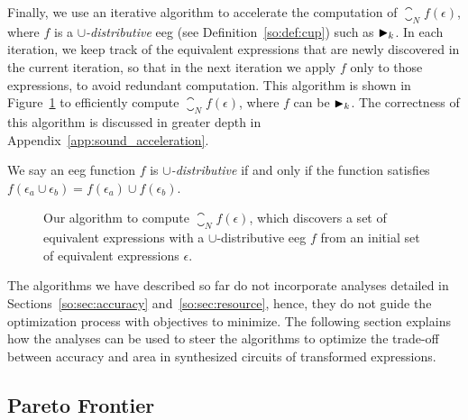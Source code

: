 Finally, we use an iterative algorithm to accelerate the computation of
$\closure_N f (\epsilon)$, where $f$ is a \emph{$\cup$-distributive} \gls{eeg}
(see Definition~\ref{so:def:cup}) such as $\operatorname{\blacktriangleright}_k$.  In each iteration,
we keep track of the equivalent expressions that are newly discovered in the
current iteration, so that in the next iteration we apply $f$ only to those
expressions, to avoid redundant computation.  This algorithm is shown in
Figure~\ref{so:alg:closure} to efficiently compute $\closure_N f(\epsilon)$,
where $f$ can be $\operatorname{\blacktriangleright}_k$.  The correctness of this algorithm is discussed
in greater depth in Appendix~\ref{app:sound_acceleration}.
\begin{definition}
    We say an \gls{eeg} function $f$ is \emph{$\cup$-distributive} if and only
    if the function satisfies $f(\epsilon_a \cup \epsilon_b) = f(\epsilon_a)
    \cup f(\epsilon_b)$.\label{so:def:cup}
\end{definition}
\begin{figure}[ht]
    \centering
    \begin{algorithmic}
        \singlespacing%
                \EndIf{}
            \EndFor{}
        \EndFunction{}
    \end{algorithmic}
    \caption{%
        Our algorithm to compute $\closure_N f (\epsilon)$, which discovers a
        set of equivalent expressions with a $\cup$-distributive \acrshort{eeg}
        $f$ from an initial set of equivalent expressions $\epsilon$.
    }\label{so:alg:closure}
\end{figure}

The algorithms we have described so far do not incorporate analyses detailed
in Sections~\ref{so:sec:accuracy} and~\ref{so:sec:resource}, hence, they do
not guide the optimization process with objectives to minimize.  The following
section explains how the analyses can be used to steer the algorithms to
optimize the trade-off between accuracy and area in synthesized circuits of
transformed expressions.


\subsection{Pareto Frontier}
\label{so:sub:pareto}

